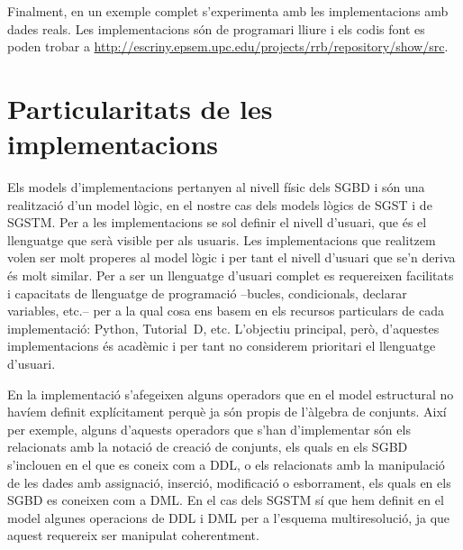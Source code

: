 Finalment, en un exemple complet s'experimenta amb les implementacions
amb dades reals. Les implementacions són de programari lliure i els
codis font es poden trobar a
\url{http://escriny.epsem.upc.edu/projects/rrb/repository/show/src}.










\section{Particularitats de les implementacions}



Els models d'implementacions pertanyen al nivell físic dels \gls{SGBD}
i són una realització d'un model lògic, en el nostre cas dels models
lògics de \gls{SGST} i de \gls{SGSTM}. Per a les implementacions se
sol definir el nivell d'usuari, que és el llenguatge que serà visible
per als usuaris. Les implementacions que realitzem volen ser molt
properes al model lògic i per tant el nivell d'usuari que se'n deriva
és molt similar. Per a ser un llenguatge d'usuari complet es
requereixen facilitats i capacitats de llenguatge de programació
--bucles, condicionals, declarar variables, etc.-- per a la qual
cosa ens basem en els recursos particulars de cada implementació:
Python, Tutorial~D, etc. L'objectiu principal, però, d'aquestes
implementacions és acadèmic i per tant no considerem prioritari el
llenguatge d'usuari.




En la implementació s'afegeixen alguns operadors que en el model
estructural no havíem definit explícitament perquè ja són propis de
l'àlgebra de conjunts. Així per exemple, alguns d'aquests operadors
que s'han d'implementar són els relacionats amb la notació de creació
de conjunts, %
els quals en els \gls{SGBD} s'inclouen en el que es coneix com a
\gls{DDL}, o els relacionats amb la manipulació de les dades amb
assignació, inserció, modificació o esborrament, els quals en els
\gls{SGBD} es coneixen com a \gls{DML}.  En el cas dels \gls{SGSTM} sí
que hem definit en el model algunes operacions de \gls{DDL} i \gls{DML} per a
l'esquema multiresolució, ja que aquest requereix ser manipulat
coherentment.













